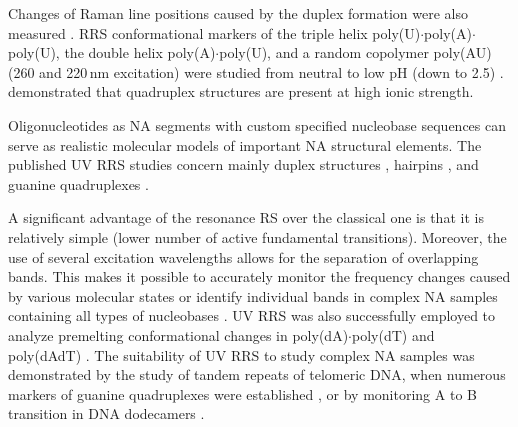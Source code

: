Changes of Raman line positions caused by the duplex formation were also
measured
\parencite{Grygon1990}.
RRS conformational markers of the triple helix
poly(U)$\cdot$poly(A)$\cdot$poly(U), the double helix poly(A)$\cdot$poly(U),
and a random copolymer poly(AU) (260 and 220\,nm excitation) were studied from
neutral to low pH (down to 2.5)
\parencite{Gfrorer1993a}.
\textcite{Wheeler1996}
demonstrated that quadruplex structures are present at
high ionic strength.

Oligonucleotides as NA segments with custom specified nucleobase sequences
can serve as realistic molecular models of important NA structural elements.
The published UV RRS studies concern mainly duplex structures
\parencite{Laigle1986},
hairpins
\parencite{Refregiers1997},
and guanine quadruplexes
\parencite{Mukerji1995}.

A significant advantage of the resonance RS over the classical one is that it
is relatively simple (lower number of active fundamental transitions).
Moreover, the use of several excitation wavelengths allows for the separation
of overlapping bands.
This makes it possible to accurately monitor the frequency changes caused by
various molecular states or identify individual bands in complex NA samples
containing all types of nucleobases
\parencite{Mukerji1995}.
UV RRS was also successfully employed to analyze premelting conformational
changes in poly(dA)$\cdot$poly(dT) and poly(dAdT)
\parencite{Chan1997}.
The suitability of UV RRS to study complex NA samples was demonstrated by the
study of tandem repeats of telomeric DNA, when numerous markers of guanine
quadruplexes were established
\parencite{Krafft2002},
or by monitoring A to B transition in DNA dodecamers
\parencite{Knee2008}.
